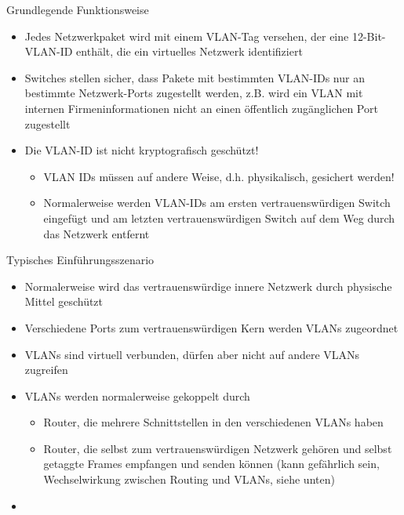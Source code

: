 \documentclass[a4paper]{article}
\begin{document}
\begin{multicols}{3}
    Grundlegende Funktionsweise

    \begin{itemize}
        \item
              Jedes Netzwerkpaket wird mit einem VLAN-Tag versehen, der eine
              12-Bit-VLAN-ID enthält, die ein virtuelles Netzwerk identifiziert
        \item
              Switches stellen sicher, dass Pakete mit bestimmten VLAN-IDs nur an
              bestimmte Netzwerk-Ports zugestellt werden, z.B. wird ein VLAN mit
              internen Firmeninformationen nicht an einen öffentlich zugänglichen
              Port zugestellt
        \item
              Die VLAN-ID ist nicht kryptografisch geschützt!

              \begin{itemize}
                  \item
                        VLAN IDs müssen auf andere Weise, d.h. physikalisch, gesichert
                        werden!
                  \item
                        Normalerweise werden VLAN-IDs am ersten vertrauenswürdigen Switch
                        eingefügt und am letzten vertrauenswürdigen Switch auf dem Weg durch
                        das Netzwerk entfernt
              \end{itemize}
    \end{itemize}

    Typisches Einführungsszenario

    \begin{itemize}
        \item
              Normalerweise wird das vertrauenswürdige innere Netzwerk durch
              physische Mittel geschützt
        \item
              Verschiedene Ports zum vertrauenswürdigen Kern werden VLANs zugeordnet
        \item
              VLANs sind virtuell verbunden, dürfen aber nicht auf andere VLANs
              zugreifen
        \item
              VLANs werden normalerweise gekoppelt durch

              \begin{itemize}
                  \item
                        Router, die mehrere Schnittstellen in den verschiedenen VLANs haben
                  \item
                        Router, die selbst zum vertrauenswürdigen Netzwerk gehören und
                        selbst getaggte Frames empfangen und senden können (kann gefährlich
                        sein, Wechselwirkung zwischen Routing und VLANs, siehe unten)
              \end{itemize}
        \item
    \end{itemize}


\end{multicols}
\end{document}
